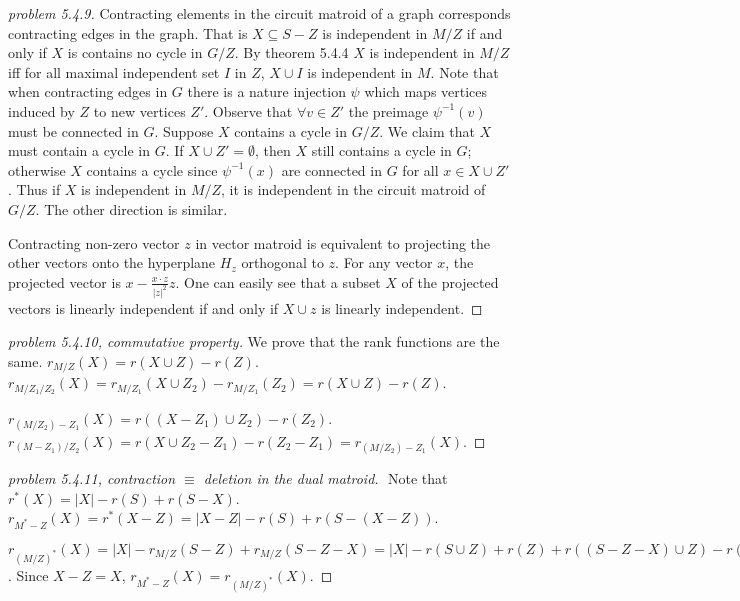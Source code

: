 \begin{proof}[problem 5.4.9]
    Contracting elements in the circuit matroid of a graph corresponds contracting edges in the graph. That is $X\subseteq S-Z$ is independent in $M/Z$ if and only if $X$ is contains no cycle in $G/Z$. By theorem 5.4.4 $X$ is independent in $M/Z$ iff for all maximal independent set $I$ in $Z$, $X\cup I$ is independent in $M$. Note that when contracting edges in $G$ there is a nature injection $\psi$ which maps vertices induced by $Z$ to new vertices $Z'$. Observe that $\forall v\in Z'$ the preimage $\psi^{-1}(v)$ must be connected in $G$. Suppose $X$ contains a cycle in $G/Z$. We claim that $X$ must contain a cycle in $G$. If $X\cup Z'= \emptyset$, then $X$ still contains a cycle in $G$; otherwise $X$ contains a cycle since $\psi^{-1}(x)$ are connected in $G$ for all $x\in X\cup Z'$. Thus if $X$ is independent in $M/Z$, it is independent in the circuit matroid of $G/Z$. The other direction is similar.

    Contracting non-zero vector $z$ in vector matroid is equivalent to projecting the other vectors onto the hyperplane $H_z$ orthogonal to $z$. For any vector $x$, the projected vector is $x-\frac{x\cdot z}{|z|^2}z$. One can easily see that a subset $X$ of the projected vectors is linearly independent if and only if $X\cup z$ is linearly independent.
\end{proof}

\begin{proof}[problem 5.4.10, commutative property]
    We prove that the rank functions are the same.
    $r_{M/Z}(X)=r(X\cup Z)-r(Z)$. $r_{M/Z_1/Z_2}(X)=r_{M/Z_1}(X\cup Z_2)-r_{M/Z_1}(Z_2)=r(X\cup Z)-r(Z)$.

    $r_{(M/Z_2)-Z_1}(X)=r((X-Z_1)\cup Z_2)-r(Z_2)$. $r_{(M-Z_1)/Z_2}(X)=r(X\cup Z_2 -Z_1)-r(Z_2-Z_1)=r_{(M/Z_2)-Z_1}(X)$.
\end{proof}
\begin{proof}[problem 5.4.11, contraction $\equiv$ deletion in the dual matroid]
    $ $
    \newline
    Note that $r^*(X)=|X|-r(S)+r(S-X)$. $r_{M^*-Z}(X)=r^*(X-Z)=|X-Z|-r(S)+r(S-(X-Z))$.

    $r_{(M/Z)^*}(X)=|X|-r_{M/Z}(S-Z)+r_{M/Z}(S-Z-X)=|X|-r(S\cup Z)+r(Z)+r((S-Z-X)\cup Z)-r(Z)=|X|-r(S)+r(S-(X-Z))$. Since $X-Z=X$, $r_{M^*-Z}(X)=r_{(M/Z)^*}(X)$.
\end{proof}

